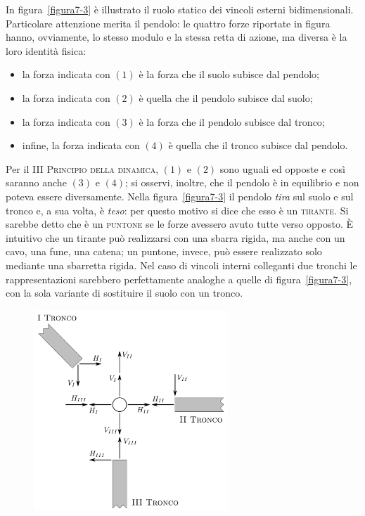 \noindent In figura~\ref{figura7-3} è illustrato il ruolo statico dei vincoli esterni bidimensionali. Particolare attenzione merita il pendolo: le quattro forze riportate in figura hanno, ovviamente, lo stesso modulo e la stessa retta di azione, ma diversa è la loro identità fisica:
\begin{itemize}
\item la forza indicata con $(1)$ è la forza che il suolo subisce dal pendolo;
\item la forza indicata con $(2)$ è quella che il pendolo subisce dal suolo; 
\item la forza indicata con $(3)$ è la forza che il pendolo subisce dal tronco;
\item infine, la forza indicata con $(4)$ è quella che il tronco subisce dal pendolo.
\end{itemize}
Per il \textsc{III Principio della dinamica}, $(1)$ e $(2)$ sono uguali ed opposte e così saranno anche $(3)$ e $(4)$; si osservi, inoltre, che il pendolo è in equilibrio e non poteva essere diversamente. Nella figura~\ref{figura7-3} il pendolo \emph{tira} sul suolo e sul tronco e, a sua volta, è \emph{teso}: per questo motivo si dice che esso è un \textsc{tirante}. Si sarebbe detto che è un \textsc{puntone} se le forze avessero avuto tutte verso opposto.  È intuitivo che un tirante può realizzarsi con una sbarra rigida, ma anche con un cavo, una fune, una catena; un puntone, invece, può essere realizzato solo mediante una sbarretta rigida. Nel caso di vincoli interni colleganti due tronchi le rappresentazioni sarebbero perfettamente analoghe a quelle di figura~\ref{figura7-3}, con la sola variante di sostituire il suolo con un tronco. 
\renewcommand{\thefigure}{7~-~4}
\begin{figure}[ht]
\centering
\includegraphics[width=0.65\textwidth]{Immagini/Parte_7/Figura7_4/Figura7_4.pdf}
\caption{}
\label{figura7-4}
\end{figure}

